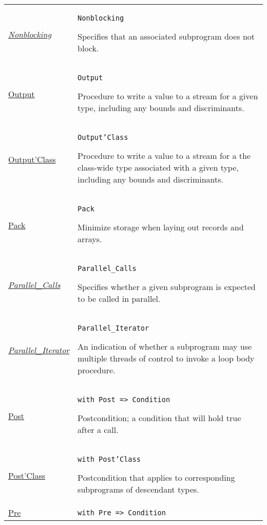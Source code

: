 \documentclass[english]{article}
\begin{document}
\begin{scriptsize}
\begin{multicols*}{3}
\begin{tabular}{@{}p{2cm}p{6.5cm}}
   \href{http://www.ada-auth.org/standards/22rm/html/RM-9-5.html}{\textit{Nonblocking}} & \texttt{Nonblocking}

   Specifies that an associated subprogram does not block.\\

   \href{http://www.ada-auth.org/standards/22rm/html/RM-13-13-2.html}{Output} & \texttt{Output}

   Procedure to write a value to a stream for a given type, including any bounds and discriminants.\\

   \href{http://www.ada-auth.org/standards/22rm/html/RM-13-13-2.html}{Output'Class} & \texttt{Output'Class}

   Procedure to write a value to a stream for a the class-wide type associated with a given type, including any bounds and discriminants.\\

   \href{http://www.ada-auth.org/standards/22rm/html/RM-13-2.html}{Pack} & \texttt{Pack}

   Minimize storage when laying out records and arrays.\\

   \href{http://www.ada-auth.org/standards/22rm/html/RM-9-10-1.html}{\textit{Parallel\_Calls}} & \texttt{Parallel\_Calls}

   Specifies whether a given subprogram is expected to be called in parallel. \\

   \href{http://www.ada-auth.org/standards/22rm/html/RM-5-5-3.html}{\textit{Parallel\_Iterator}} & \texttt{Parallel\_Iterator}

   An indication of whether a subprogram may use multiple threads of control to invoke a loop body procedure.\\

   \href{http://www.ada-auth.org/standards/22rm/html/RM-6-1-1.html}{Post} & \texttt{with Post => Condition}

   Postcondition; a condition that will hold true after a call.\\

   \href{http://www.ada-auth.org/standards/22rm/html/RM-6-1-1.html}{Post'Class} & \texttt{with Post'Class}

   Postcondition that applies to corresponding subprograms of descendant types.\\

   \href{http://www.ada-auth.org/standards/22rm/html/RM-6-1-1.html}{Pre} & \texttt{with Pre => Condition}


\end{tabular}
\end{multicols*}
\end{scriptsize}
\end{document}
